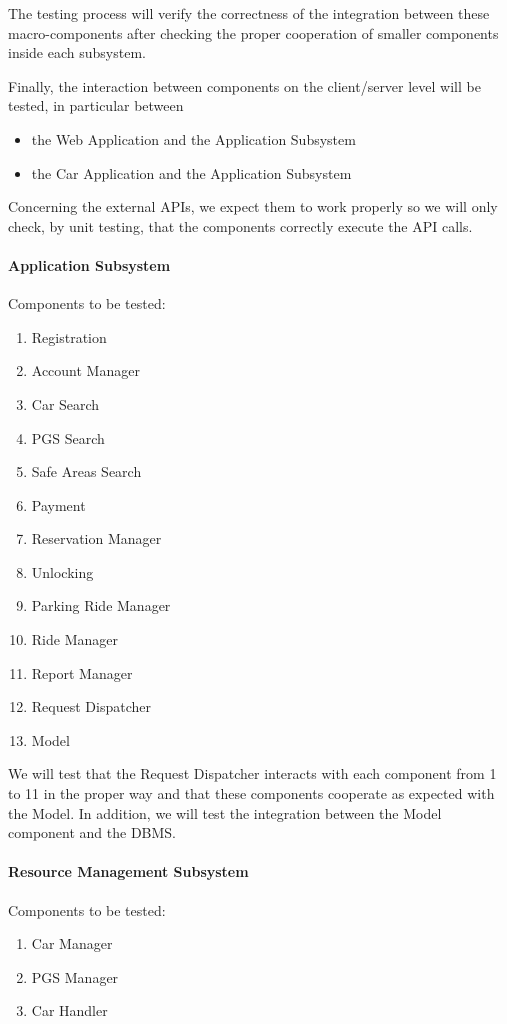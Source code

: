 \documentclass[english]{article}
\begin{document}
The testing process will verify the correctness of the integration between these macro-components after checking the proper cooperation of smaller components inside each subsystem.

Finally, the interaction between components on the client/server level will be tested, in particular between
\begin{itemize}
\item the Web Application and the Application Subsystem
\item the Car Application and the Application Subsystem
\end{itemize}

Concerning the external APIs, we expect them to work properly so we will only check, by unit testing, that the components correctly execute the API calls.


\paragraph{Application Subsystem}
Components to be tested:
\begin{enumerate}
\item Registration
\item Account Manager
\item Car Search
\item PGS Search
\item Safe Areas Search
\item Payment
\item Reservation Manager
\item Unlocking
\item Parking Ride Manager
\item Ride Manager
\item Report Manager
\item Request Dispatcher
\item Model
\end{enumerate}

We will test that the Request Dispatcher interacts with each component from 1 to 11 in the proper way and that these components cooperate as expected with the Model. In addition, we will test the integration between the Model component and the DBMS.

\paragraph{Resource Management Subsystem}
Components to be tested:
\begin{enumerate}
\item Car Manager
\item PGS Manager
\item Car Handler
\end{enumerate}
\end{document}
